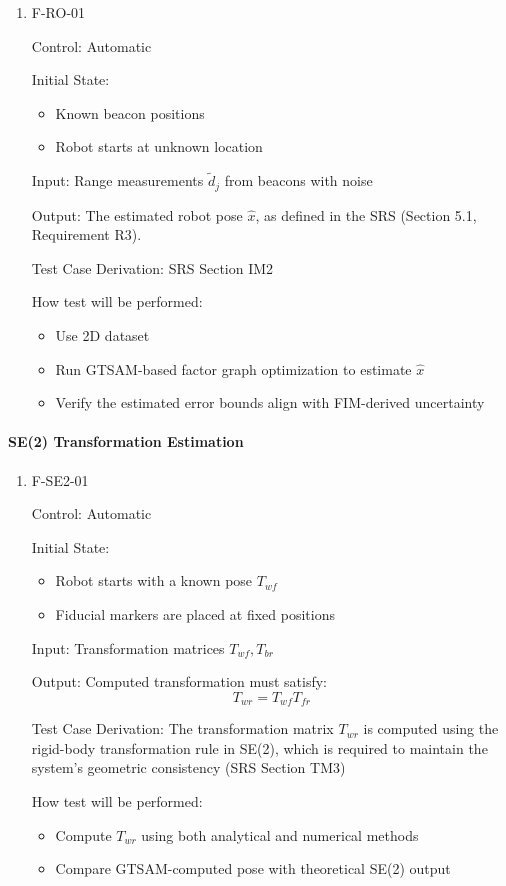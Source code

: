 \documentclass[12pt, titlepage]{article}
\begin{document}
\begin{enumerate}

\item{F-RO-01\\}

Control: Automatic
					
Initial State: 
\begin{itemize}
  \item Known beacon positions
  \item Robot starts at unknown location
\end{itemize}
					
Input: Range measurements $\tilde{d}_j$ from beacons with noise

Output: The estimated robot pose $\hat{x}$, as defined in the SRS (Section 5.1, Requirement R3).
 

Test Case Derivation: SRS Section IM2
					
How test will be performed: 
\begin{itemize}
  \item Use 2D dataset
  \item Run GTSAM-based factor graph optimization to estimate $\hat{x}$
  \item Verify the estimated error bounds align with FIM-derived uncertainty
\end{itemize}

\end{enumerate}


\paragraph{SE(2) Transformation Estimation}
\begin{enumerate}					
\item{F-SE2-01\\}

Control: Automatic
					
Initial State: 
\begin{itemize}
  \item Robot starts with a known pose $T_{wf}$
  \item Fiducial markers are placed at fixed positions
\end{itemize}
					
Input: Transformation matrices $T_{wf}, T_{br}$ 

Output: Computed transformation must satisfy:
\[
T_{wr} = T_{wf} T_{fr}
\]

Test Case Derivation: The transformation matrix $T_{wr}$ is computed using the rigid-body transformation rule in SE(2), which is required to maintain the system’s geometric consistency (SRS Section TM3)

How test will be performed: 
\begin{itemize}
  \item Compute $T_{wr}$ using both analytical and numerical methods
  \item Compare GTSAM-computed pose with theoretical SE(2) output
\end{itemize}
\end{enumerate}
\end{document}
